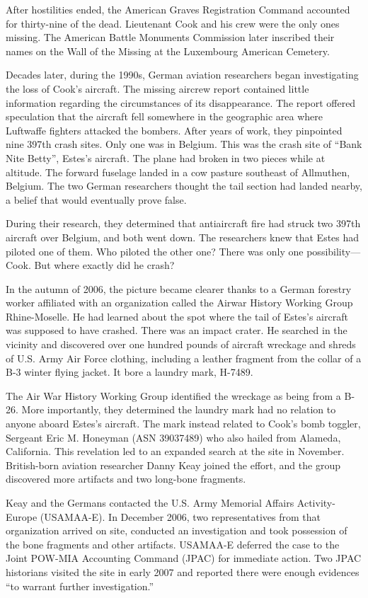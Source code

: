 \documentclass{article}
\begin{document}
\begin{multicols}{3}
After hostilities ended, the American Graves Registration Command accounted for thirty-nine of the dead. Lieutenant Cook and his crew were the only ones missing. The American Battle Monuments Commission later inscribed their names on the Wall of the Missing at the Luxembourg American Cemetery.

Decades later, during the 1990s, German aviation researchers began investigating the loss of Cook’s aircraft. The missing aircrew report contained little information regarding the circumstances of its disappearance. The report offered speculation that the aircraft fell somewhere in the geographic area where Luftwaffe fighters attacked the bombers. After years of work, they pinpointed nine 397th crash sites. Only one was in Belgium. This was the crash site of “Bank Nite Betty”, Estes’s aircraft. The plane had broken in two pieces while at altitude. The forward fuselage landed in a cow pasture southeast of Allmuthen, Belgium. The two German researchers thought the tail section had landed nearby, a belief that would eventually prove false.

During their research, they determined that antiaircraft fire had struck two 397th aircraft over Belgium, and both went down. The researchers knew that Estes had piloted one of them. Who piloted the other one? There was only one possibility—Cook. But where exactly did he crash?

In the autumn of 2006, the picture became clearer thanks to a German forestry worker affiliated with an organization called the Airwar History Working Group Rhine-Moselle. He had learned about the spot where the tail of Estes’s aircraft was supposed to have crashed. There was an impact crater. He searched in the vicinity and discovered over one hundred pounds of aircraft wreckage and shreds of U.S. Army Air Force clothing, including a leather fragment from the collar of a B-3 winter flying jacket. It bore a laundry mark, H-7489.

The Air War History Working Group identified the wreckage as being from a B-26. More importantly, they determined the laundry mark had no relation to anyone aboard Estes’s aircraft. The mark instead related to Cook’s bomb toggler, Sergeant Eric M. Honeyman (ASN 39037489) who also hailed from Alameda, California. This revelation led to an expanded search at the site in November. British-born aviation researcher Danny Keay joined the effort, and the group discovered more artifacts and two long-bone fragments.

Keay and the Germans contacted the U.S. Army Memorial Affairs Activity-Europe (USAMAA-E). In December 2006, two representatives from that organization arrived on site, conducted an investigation and took possession of the bone fragments and other artifacts. USAMAA-E deferred the case to the Joint POW-MIA Accounting Command (JPAC) for immediate action. Two JPAC historians visited the site in early 2007 and reported there were enough evidences “to warrant further investigation.”


\end{multicols}
\end{document}
